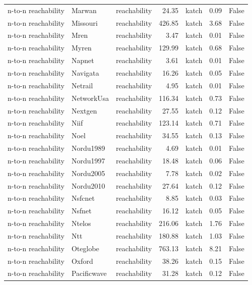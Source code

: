 \begin{tabular}{lllrlrr}
n-to-n reachability & Marwan & reachability & 24.35 & katch & 0.09 & False \\
n-to-n reachability & Missouri & reachability & 426.85 & katch & 3.68 & False \\
n-to-n reachability & Mren & reachability & 3.47 & katch & 0.01 & False \\
n-to-n reachability & Myren & reachability & 129.99 & katch & 0.68 & False \\
n-to-n reachability & Napnet & reachability & 3.61 & katch & 0.01 & False \\
n-to-n reachability & Navigata & reachability & 16.26 & katch & 0.05 & False \\
n-to-n reachability & Netrail & reachability & 4.95 & katch & 0.01 & False \\
n-to-n reachability & NetworkUsa & reachability & 116.34 & katch & 0.73 & False \\
n-to-n reachability & Nextgen & reachability & 27.55 & katch & 0.12 & False \\
n-to-n reachability & Niif & reachability & 123.14 & katch & 0.71 & False \\
n-to-n reachability & Noel & reachability & 34.55 & katch & 0.13 & False \\
n-to-n reachability & Nordu1989 & reachability & 4.69 & katch & 0.01 & False \\
n-to-n reachability & Nordu1997 & reachability & 18.48 & katch & 0.06 & False \\
n-to-n reachability & Nordu2005 & reachability & 7.78 & katch & 0.02 & False \\
n-to-n reachability & Nordu2010 & reachability & 27.64 & katch & 0.12 & False \\
n-to-n reachability & Nsfcnet & reachability & 8.85 & katch & 0.03 & False \\
n-to-n reachability & Nsfnet & reachability & 16.12 & katch & 0.05 & False \\
n-to-n reachability & Ntelos & reachability & 216.06 & katch & 1.76 & False \\
n-to-n reachability & Ntt & reachability & 180.88 & katch & 1.03 & False \\
n-to-n reachability & Oteglobe & reachability & 763.13 & katch & 8.21 & False \\
n-to-n reachability & Oxford & reachability & 38.26 & katch & 0.15 & False \\
n-to-n reachability & Pacificwave & reachability & 31.28 & katch & 0.12 & False \\

\end{tabular}
